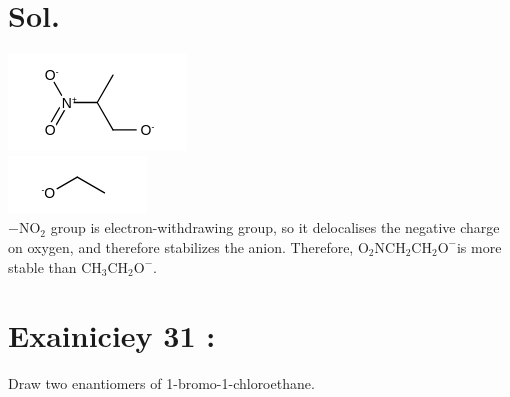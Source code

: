 \documentclass[10pt]{article}
\begin{document}
\section*{Sol.}
\includegraphics{smile-eecfbdf62192293b3c29cdff1cd35b1e9ce2118c}\\
\includegraphics{smile-c04b0084dfa451611099f42ba89eb42b0de7ab46}\\
$-\mathrm{NO}_{2}$ group is electron-withdrawing group, so it delocalises the negative charge on oxygen, and therefore stabilizes the anion. Therefore, $\mathrm{O}_{2} \mathrm{NCH}_{2} \mathrm{CH}_{2} \mathrm{O}^{-}$is more stable than $\mathrm{CH}_{3} \mathrm{CH}_{2} \mathrm{O}^{-}$.

\section*{Exainiciey 31 :}
Draw two enantiomers of 1-bromo-1-chloroethane.
\end{document}
